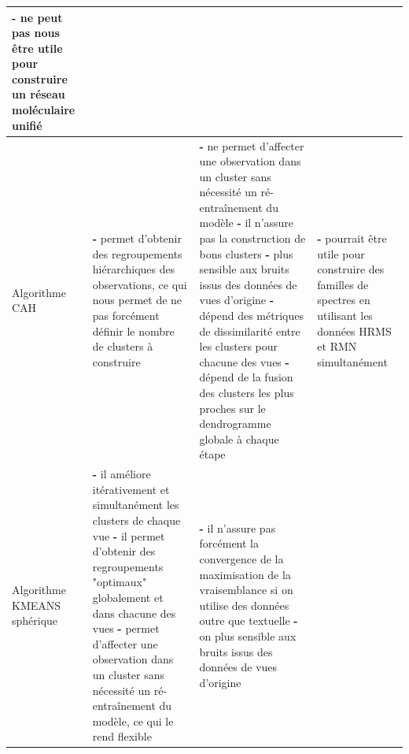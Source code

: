 \documentclass[12pt, french, latin.medieval, a4paper]{report}
\begin{document}
\begin{center}
\begin{longtable}{|p{2.5cm}|p{4.5cm}|p{4.5cm}|p{3cm}|}
                    	{\textbf{-} ne peut pas nous être utile pour construire un réseau moléculaire unifié }
                    	\\
                    	\hline
                    	Algorithme CAH
                    	&
                    	{\textbf{-} permet d'obtenir des regroupements hiérarchiques des observations, ce qui nous permet de ne pas forcément définir le nombre de clusters à construire}
                    	&
                    	{\textbf{-} ne permet d'affecter une observation dans un cluster sans nécessité un ré-entraînement du modèle} \newline\newline
                    	{\textbf{-} il n'assure pas la construction de bons clusters} \newline\newline
                    	{\textbf{-} plus sensible aux bruits issus des données de vues d'origine} \newline\newline
                    	{\textbf{-} dépend des métriques de dissimilarité entre les clusters pour chacune des vues } \newline\newline
                    	{\textbf{-} dépend de la fusion des clusters les plus proches sur le dendrogramme globale à chaque étape }
                    	&
                    	{\textbf{-} pourrait être utile pour construire des familles de spectres en utilisant les données HRMS et RMN simultanément }
                    	\\
                    	\hline
                    	Algorithme KMEANS sphérique
                    	&
                    	{\textbf{-} il améliore itérativement et simultanément les clusters de chaque vue} \newline\newline
                    	{\textbf{-} il permet d'obtenir des regroupements "optimaux" globalement et dans chacune des vues} \newline \newline
                    	{\textbf{-} permet d'affecter une observation dans un cluster sans nécessité un ré-entraînement du modèle, ce qui le rend flexible}
                    	&
                    	{\textbf{-} il n'assure pas forcément la convergence de la maximisation de la vraisemblance si on utilise des données outre que textuelle} \newline\newline
                    	{\textbf{-} on plus sensible aux bruits issus des données de vues d'origine} \newline\newline

\end{longtable}
\end{center}
\end{document}
